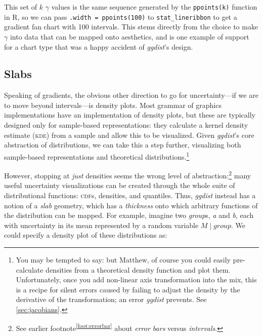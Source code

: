 \documentclass[journal]{vgtc}                     %
\begin{document}
This set of $k$  $\gamma$ values is the same sequence generated by the \texttt{ppoints(k)} function in R, so we can pass \texttt{.width = ppoints(100)} to \texttt{stat\_lineribbon} to get a gradient fan chart with 100 intervals. This stems directly from the choice to make $\gamma$ into data that can be mapped onto aesthetics, and is one example of support for a chart type that was a happy accident of \textit{ggdist}'s design.

\subsection{Slabs}

Speaking of gradients, the obvious other direction to go for uncertainty---if we are to move beyond intervals---is density plots. Most grammar of graphics implementations have an implementation of density plots, but these are typically designed only for sample-based representations: they calculate a kernel density estimate (\textsc{kde}) from a sample and allow this to be visualized. Given \textit{ggdist}'s core abstraction of distributions, we can take this a step further, visualizing both sample-based representations and theoretical distributions.\footnote{\label{foot:jacobians}You may be tempted to say: but Matthew, of course you could easily pre-calculate densities from a theoretical density function and plot them. Unfortunately, once you add non-linear axis transformation into the mix, this is a recipe for silent errors caused by failing to adjust the density by the derivative of the transformation; an error \textit{ggdist} prevents. See \cref{sec:jacobians}.} 

However, stopping at \textit{just} densities seems the wrong level of abstraction:\footnote{See earlier footnote\textsuperscript{\ref{foot:errorbar}} about \textit{error bars} versus \textit{intervals}.} many useful uncertainty visualizations can be created through the whole suite of distributional functions: \textsc{cdf}s, densities, and quantiles. Thus, \textit{ggdist} instead has a notion of a \textit{slab} geometry, which has a \textit{thickness} onto which arbitrary functions of the distribution can be mapped. For example, imagine two \textit{group}s, \textit{a} and \textit{b}, each with uncertainty in its mean represented by a random variable $M \mid group$. We could specify a density plot of these distributions as:
\end{document}
